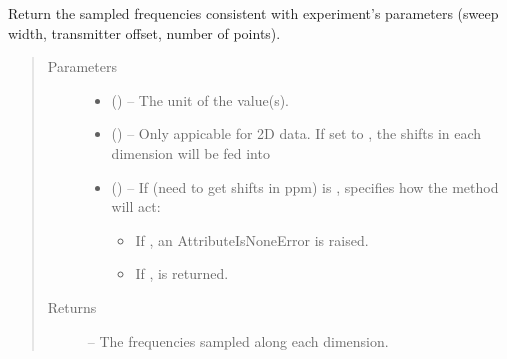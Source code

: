 \documentclass[letterpaper,10pt,english]{sphinxmanual}
\begin{document}
\begin{fulllineitems}
\begin{fulllineitems}
\label{\detokenize{references/core:nmrespy.core.Estimator.get_shifts}}
\sphinxAtStartPar
Return the sampled frequencies consistent with experiment’s
parameters (sweep width, transmitter offset, number of points).
\begin{quote}\begin{description}
\item[{Parameters}] \leavevmode\begin{itemize}
\item {} 
\sphinxAtStartPar
{} (\sphinxstyleliteralemphasis{\sphinxupquote{, }}) – The unit of the value(s).

\item {} 
\sphinxAtStartPar
{} () – Only appicable for 2D data. If set to , the shifts in
each dimension will be fed into

\item {} 
\sphinxAtStartPar
{} () – 
\sphinxAtStartPar
If  (need to get shifts in ppm) is , 
specifies how the method will act:
\begin{itemize}
\item {} 
\sphinxAtStartPar
If , an AttributeIsNoneError is raised.

\item {} 
\sphinxAtStartPar
If ,  is returned.

\end{itemize}


\end{itemize}

\item[{Returns}] \leavevmode
\sphinxAtStartPar
{} – The frequencies sampled along each dimension.


\end{description}
\end{quote}
\end{fulllineitems}
\end{fulllineitems}
\end{document}
